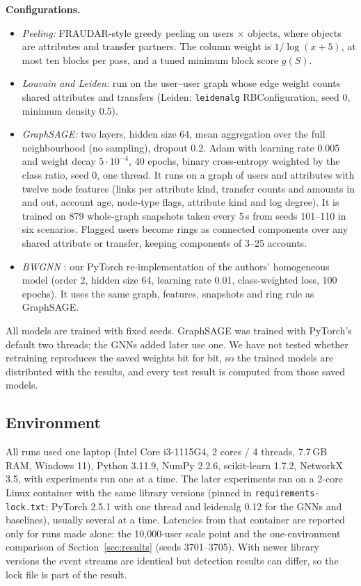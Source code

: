 \textbf{Configurations.}
\begin{itemize}
\item \emph{Peeling:} FRAUDAR-style greedy peeling on users $\times$ objects,
where objects are attributes and transfer partners. The column weight is
$1/\log(x+5)$, at most ten blocks per pass, and a tuned minimum block score
$g(S)$.
\item \emph{Louvain and Leiden:} run on the user--user graph whose edge weight
counts shared attributes and transfers (Leiden: \texttt{leidenalg}
RBConfiguration, seed 0, minimum density 0.5).
\item \emph{GraphSAGE:} two layers, hidden size 64, mean aggregation over the
full neighbourhood (no sampling), dropout 0.2. Adam with learning rate 0.005 and
weight decay $5\cdot10^{-4}$, 40 epochs, binary cross-entropy weighted by the
class ratio, seed 0, one thread. It runs on a graph of users and attributes with
twelve node features (links per attribute kind, transfer counts and amounts in and
out, account age, node-type flags, attribute kind and log degree). It is trained
on 879 whole-graph snapshots taken every 5\,s from seeds 101--110 in six
scenarios. Flagged users become rings as connected components over any shared
attribute or transfer, keeping components of 3--25 accounts.
\item \emph{BWGNN} \cite{tang2022bwgnn}: our PyTorch re-implementation of the
authors' homogeneous model (order 2, hidden size 64, learning rate 0.01,
class-weighted loss, 100 epochs). It uses the same graph, features, snapshots
and ring rule as GraphSAGE.
\end{itemize}
All models are trained with fixed seeds. GraphSAGE was trained with
PyTorch's default two threads; the GNNs added later use one. We have not
tested whether retraining reproduces the saved weights bit for bit, so the
trained models are distributed with the results, and every test result is
computed from those saved models.

\subsection{Environment}
All runs used one laptop (Intel Core i3-1115G4, 2 cores / 4 threads, 7.7\,GB
RAM, Windows 11), Python 3.11.9, NumPy 2.2.6, scikit-learn 1.7.2,
NetworkX 3.5, with experiments run one at a time. The later experiments ran
on a 2-core Linux container with the same library versions (pinned in
\texttt{requirements-lock.txt}; PyTorch 2.5.1 with one thread and leidenalg 0.12
for the GNNs and baselines), usually several at a time. Latencies from that
container are reported only for runs made alone: the 10{,}000-user scale point
and the one-environment comparison of Section~\ref{sec:results} (seeds
3701--3705). With newer
library versions the event streams are identical but detection results can
differ, so the lock file is part of the result.

